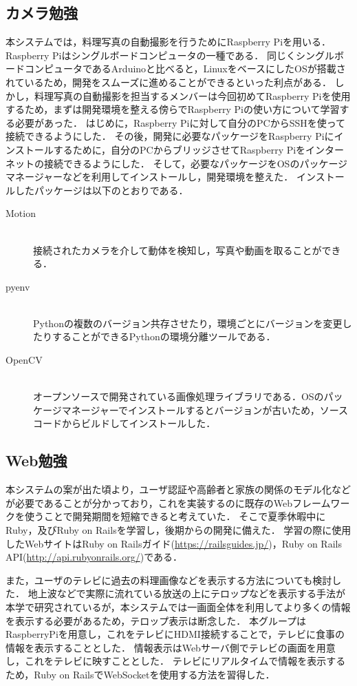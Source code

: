 \documentclass[../report]{subfiles}
\begin{document}
\subsection{カメラ勉強}
本システムでは，料理写真の自動撮影を行うためにRaspberry Piを用いる．
Raspberry Piはシングルボードコンピュータの一種である．
同じくシングルボードコンピュータであるArduinoと比べると，LinuxをベースにしたOSが搭載されているため，開発をスムーズに進めることができるといった利点がある．
しかし，料理写真の自動撮影を担当するメンバーは今回初めてRaspberry Piを使用するため，まずは開発環境を整える傍らでRaspberry Piの使い方について学習する必要があった．
はじめに，Raspberry Piに対して自分のPCからSSHを使って接続できるようにした．
その後，開発に必要なパッケージをRaspberry Piにインストールするために，自分のPCからブリッジさせてRaspberry Piをインターネットの接続できるようにした．
そして，必要なパッケージをOSのパッケージマネージャーなどを利用してインストールし，開発環境を整えた．
インストールしたパッケージは以下のとおりである．
\begin{description}
    \item[Motion] \mbox{}\\
    接続されたカメラを介して動体を検知し，写真や動画を取ることができる．
    \item[pyenv] \mbox{}\\
    Pythonの複数のバージョン共存させたり，環境ごとにバージョンを変更したりすることができるPythonの環境分離ツールである．
    \item[OpenCV] \mbox{}\\
    オープンソースで開発されている画像処理ライブラリである．OSのパッケージマネージャーでインストールするとバージョンが古いため，ソースコードからビルドしてインストールした．
\end{description}


\subsection{Web勉強}
本システムの案が出た頃より，ユーザ認証や高齢者と家族の関係のモデル化などが必要であることが分かっており，これを実装するのに既存のWebフレームワークを使うことで開発期間を短縮できると考えていた．
そこで夏季休暇中にRuby，及びRuby on Railsを学習し，後期からの開発に備えた．
学習の際に使用したWebサイトはRuby on Railsガイド(\url{https://railsguides.jp/})，Ruby on Rails API(\url{http://api.rubyonrails.org/})である．

また，ユーザのテレビに過去の料理画像などを表示する方法についても検討した．
地上波などで実際に流れている放送の上にテロップなどを表示する手法が本学で研究されているが，本システムでは一画面全体を利用してより多くの情報を表示する必要があるため，テロップ表示は断念した．
本グループはRaspberryPiを用意し，これをテレビにHDMI接続することで，テレビに食事の情報を表示することとした．
情報表示はWebサーバ側でテレビの画面を用意し，これをテレビに映すこととした．
テレビにリアルタイムで情報を表示するため，Ruby on RailsでWebSocketを使用する方法を習得した．
\end{document}
